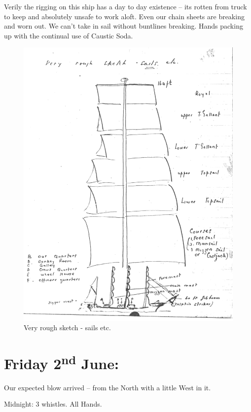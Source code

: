 \documentclass[
  11pt,
  msmallroyalvopaper
]{memoir}
\begin{document}
Verily the rigging on this ship has a day to day existence -- its rotten
from truck to keep and absolutely unsafe to work aloft. Even our chain
sheets are breaking and worn out. We can't take in sail without
buntlines breaking. Hands packing up with the continual use of Caustic
Soda.

\begin{figure}
\centering
\includegraphics{./images/illustration.jpg}
\caption{Very rough sketch - sails etc.}
\end{figure}

\hypertarget{friday-2nd-june}{%
\section{\texorpdfstring{Friday 2\textsuperscript{nd}
June:}{Friday 2nd June:}}\label{friday-2nd-june}}

Our expected blow arrived -- from the North with a little West in it.

Midnight: 3 whistles. All Hands.
\end{document}
